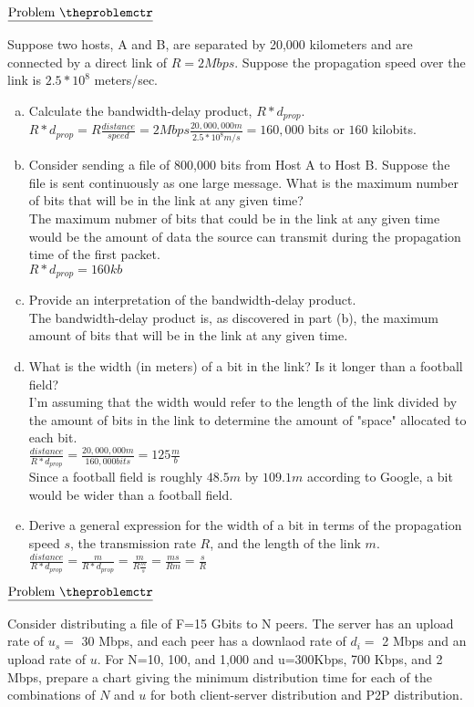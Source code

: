 \documentclass[11pt]{article}
\def\pp{\par\noindent}
\begin{document}
\addtocounter{problemctr}{1}
\bigskip
\noindent
$\underline{\rm Problem\ \theproblemctr}$\pp
Suppose two hosts, A and B, are separated by 20,000 kilometers and are connected by a direct link of $R=2Mbps$. Suppose the propagation speed over the link is $2.5*10^8$ meters/sec.
\begin{enumerate}[a.]
    \item Calculate the bandwidth-delay product, $R*d_{prop}$.\\
    $R*d_{prop}=R\frac{distance}{speed}=2Mbps\frac{20,000,000m}{2.5*10^8m/s}=160,000$ bits or $160$ kilobits.
    \item Consider sending a file of 800,000 bits from Host A to Host B. Suppose the file is sent continuously as one large message. What is the maximum number of bits that will be in the link at any given time?\\
    The maximum nubmer of bits that could be in the link at any given time would be the amount of data the source can transmit during the propagation time of the first packet.\\
    $R*d_{prop}=160kb$
    \item Provide an interpretation of the bandwidth-delay product.\\
    The bandwidth-delay product is, as discovered in part (b), the maximum amount of bits that will be in the link at any given time.
    \item What is the width (in meters) of a bit in the link? Is it longer than a football field?\\
    I'm assuming that the width would refer to the length of the link divided by the amount of bits in the link to determine the amount of "space" allocated to each bit.\\
    $\frac{distance}{R*d_{prop}}=\frac{20,000,000m}{160,000bits}=125\frac{m}{b}$\\
    Since a football field is roughly $48.5m$ by $109.1m$ according to Google, a bit would be wider than a football field.
    \item Derive a general expression for the width of a bit in terms of the propagation speed $s$, the transmission rate $R$, and the length of the link $m$.\\
    $\frac{distance}{R*d_{prop}}=\frac{m}{R*d_{prop}}=\frac{m}{R\frac{m}{s}}=\frac{ms}{Rm}=\frac{s}{R}$
\end{enumerate}

\addtocounter{problemctr}{1}
\bigskip
\noindent
$\underline{\rm Problem\ \theproblemctr}$\pp
Consider distributing a file of F=15 Gbits to N peers. The server has an upload rate of $u_s=$ 30 Mbps, and each peer has a downlaod rate of $d_i=$ 2 Mbps and an upload rate of $u$. For N=10, 100, and 1,000 and u=300Kbps, 700 Kbps, and 2 Mbps, prepare a chart giving the minimum distribution time for each of the combinations of $N$ and $u$ for both client-server distribution and P2P distribution.\\
\end{document}
